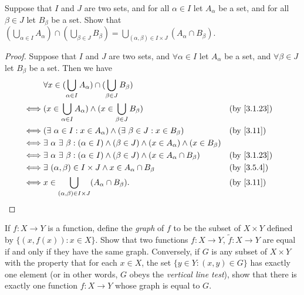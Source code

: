 \begin{ex}\label{ex:3.5.9}
  Suppose that \(I\) and \(J\) are two sets, and for all \(\alpha \in I\) let \(A_{\alpha}\) be a set, and for all \(\beta \in J\) let \(B_{\beta}\) be a set.
  Show that \((\bigcup_{\alpha \in I} A_{\alpha}) \cap (\bigcup_{\beta \in J} B_{\beta}) = \bigcup_{(\alpha, \beta) \in I \times J} (A_{\alpha} \cap B_{\beta})\).
\end{ex}

\begin{proof}
  Suppose that \(I\) and \(J\) are two sets, and \(\forall \alpha \in I\) let \(A_{\alpha}\) be a set, and \(\forall \beta \in J\) let \(B_{\beta}\) be a set.
  Then we have
  \begin{align*}
         & \forall x \in (\bigcup_{\alpha \in I} A_{\alpha}) \cap (\bigcup_{\beta \in J} B_{\beta})                                                              \\
    \iff & (x \in \bigcup_{\alpha \in I} A_{\alpha}) \land (x \in \bigcup_{\beta \in J} B_{\beta})                                &  & \text{(by \cref{3.1.23})} \\
    \iff & (\exists\ \alpha \in I : x \in A_{\alpha}) \land (\exists\ \beta \in J : x \in B_{\beta})                              &  & \text{(by \cref{3.11})}   \\
    \iff & \exists\ \alpha \ \exists\ \beta : (\alpha \in I) \land (\beta \in J) \land (x \in A_{\alpha}) \land (x \in B_{\beta})                                \\
    \iff & \exists\ \alpha \ \exists\ \beta : (\alpha \in I) \land (\beta \in J) \land (x \in A_{\alpha} \cap B_{\beta})          &  & \text{(by \cref{3.1.23})} \\
    \iff & \exists\ (\alpha, \beta) \in I \times J \land x \in A_{\alpha} \cap B_{\beta}                                          &  & \text{(by \cref{3.5.4})}  \\
    \iff & x \in \bigcup_{(\alpha, \beta) \in I \times J} (A_{\alpha} \cap B_{\beta}).                                            &  & \text{(by \cref{3.11})}
  \end{align*}
\end{proof}

\begin{ex}\label{ex:3.5.10}
  If \(f : X \to Y\) is a function, define the \emph{graph} of \(f\) to be the subset of \(X \times Y\) defined by \(\{(x, f(x)) : x \in X\}\).
  Show that two functions \(f : X \to Y\), \(\tilde{f} : X \to Y\) are equal if and only if they have the same graph.
  Conversely, if \(G\) is any subset of \(X \times Y\) with the property that for each \(x \in X\), the set \(\{y \in Y : (x, y) \in G\}\) has exactly one element (or in other words, \(G\) obeys the \emph{vertical line test}), show that there is exactly one function \(f : X \to Y\) whose graph is equal to \(G\).
\end{ex}

